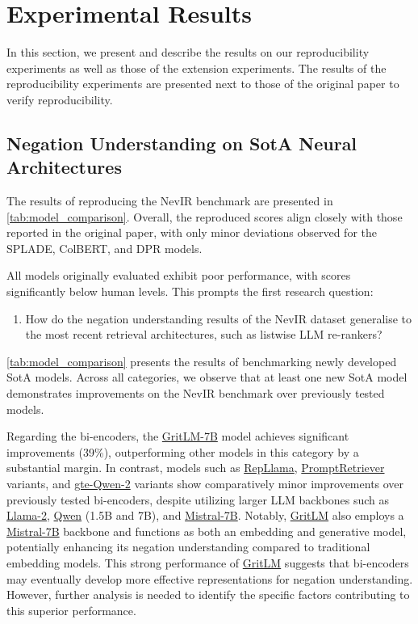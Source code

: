 
\section{Experimental Results}
In this section, we present and describe the results on our reproducibility experiments as well as those of the extension experiments. The results of the reproducibility experiments are presented next to those of the original paper to verify reproducibility.

\subsection{Negation Understanding on SotA Neural Architectures}
The results of reproducing the NevIR benchmark are presented in \autoref{tab:model_comparison}. Overall, the reproduced scores align closely with those reported in the original paper, with only minor deviations observed for the SPLADE, ColBERT, and DPR models.

All models originally evaluated exhibit poor performance, with scores significantly below human levels. This prompts the first research question: 
\begin{enumerate}[label=\textbf{RQ\arabic*}]
    \item How do the negation understanding results of the NevIR dataset generalise to the most recent retrieval architectures, such as listwise LLM re-rankers?\label{rq1}
\end{enumerate}



\autoref{tab:model_comparison} presents the results of benchmarking newly developed SotA models. Across all categories, we observe that at least one new SotA model demonstrates improvements on the NevIR benchmark over previously tested models.

Regarding the bi-encoders, the \url{GritLM-7B} model achieves significant improvements (39\%), outperforming other models in this category by a substantial margin. In contrast, models such as \url{RepLlama}, \url{PromptRetriever} variants, and \url{gte-Qwen-2} variants show comparatively minor improvements over previously tested bi-encoders, despite utilizing larger LLM backbones such as \url{Llama-2}, \url{Qwen} (1.5B and 7B), and \url{Mistral-7B}. Notably, \url{GritLM} also employs a \url{Mistral-7B} backbone and functions as both an embedding and generative model, potentially enhancing its negation understanding compared to traditional embedding models. This strong performance of \url{GritLM} suggests that bi-encoders may eventually develop more effective representations for negation understanding. However, further analysis is needed to identify the specific factors contributing to this superior performance.


